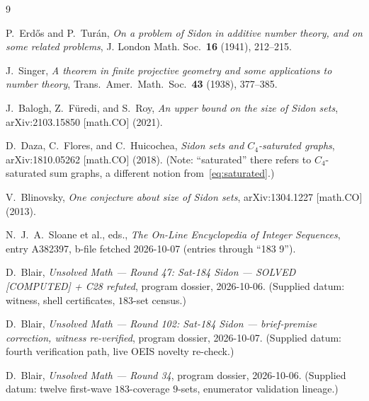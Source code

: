 \documentclass[11pt,a4paper]{article}
\theoremstyle{definition}
\begin{document}
\begin{thebibliography}{9}

P.~Erd\H{o}s and P.~Tur\'an,
\emph{On a problem of Sidon in additive number theory, and on some
related problems},
J. London Math. Soc.\ \textbf{16} (1941), 212--215.

J.~Singer,
\emph{A theorem in finite projective geometry and some applications to
number theory},
Trans.\ Amer.\ Math.\ Soc.\ \textbf{43} (1938), 377--385.

J.~Balogh, Z.~F\"uredi, and S.~Roy,
\emph{An upper bound on the size of Sidon sets},
arXiv:2103.15850 [math.CO] (2021).

D.~Daza, C.~Flores, and C.~Huicochea,
\emph{Sidon sets and $C_4$-saturated graphs},
arXiv:1810.05262 [math.CO] (2018).
(Note: ``saturated'' there refers to $C_4$-saturated sum graphs, a
different notion from~\eqref{eq:saturated}.)

V.~Blinovsky,
\emph{One conjecture about size of Sidon sets},
arXiv:1304.1227 [math.CO] (2013).

N.~J.~A.~Sloane et al., eds.,
\emph{The On-Line Encyclopedia of Integer Sequences},
entry A382397, b-file fetched 2026-10-07 (entries through ``183 9'').

D.~Blair,
\emph{Unsolved Math --- Round 47: Sat-184 Sidon --- SOLVED [COMPUTED] +
C28 refuted},
program dossier, 2026-10-06.
(Supplied datum: witness, shell certificates, $183$-set census.)

D.~Blair,
\emph{Unsolved Math --- Round 102: Sat-184 Sidon --- brief-premise
correction, witness re-verified},
program dossier, 2026-10-07.
(Supplied datum: fourth verification path, live OEIS novelty re-check.)

D.~Blair,
\emph{Unsolved Math --- Round 34},
program dossier, 2026-10-06.
(Supplied datum: twelve first-wave $183$-coverage $9$-sets, enumerator
validation lineage.)

\end{thebibliography}
\end{document}
